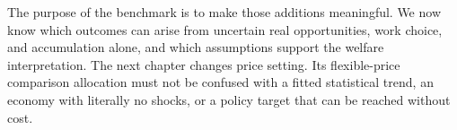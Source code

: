 The purpose of the benchmark is to make those additions meaningful. We now know
which outcomes can arise from uncertain real opportunities, work choice, and
accumulation alone, and which assumptions support the welfare interpretation.
The next chapter changes price setting. Its flexible-price comparison allocation
must not be confused with a fitted statistical trend, an economy with literally
no shocks, or a policy target that can be reached without cost.
